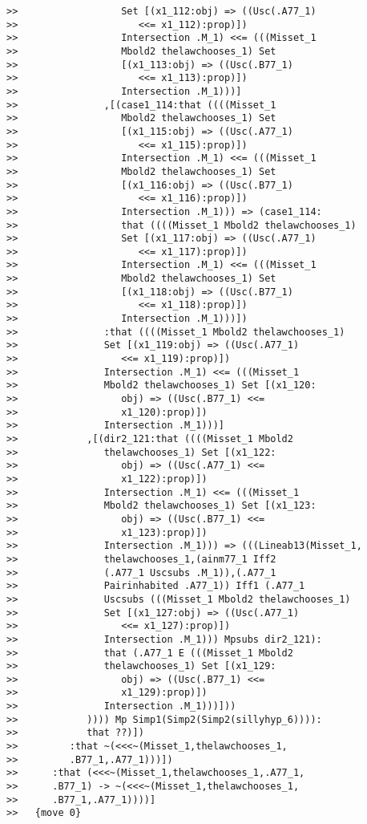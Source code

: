 \documentclass[12pt]{article}
\begin{document}
\begin{verbatim}
>>                  Set [(x1_112:obj) => ((Usc(.A77_1)
>>                     <<= x1_112):prop)])
>>                  Intersection .M_1) <<= (((Misset_1
>>                  Mbold2 thelawchooses_1) Set
>>                  [(x1_113:obj) => ((Usc(.B77_1)
>>                     <<= x1_113):prop)])
>>                  Intersection .M_1)))]
>>               ,[(case1_114:that ((((Misset_1
>>                  Mbold2 thelawchooses_1) Set
>>                  [(x1_115:obj) => ((Usc(.A77_1)
>>                     <<= x1_115):prop)])
>>                  Intersection .M_1) <<= (((Misset_1
>>                  Mbold2 thelawchooses_1) Set
>>                  [(x1_116:obj) => ((Usc(.B77_1)
>>                     <<= x1_116):prop)])
>>                  Intersection .M_1))) => (case1_114:
>>                  that ((((Misset_1 Mbold2 thelawchooses_1)
>>                  Set [(x1_117:obj) => ((Usc(.A77_1)
>>                     <<= x1_117):prop)])
>>                  Intersection .M_1) <<= (((Misset_1
>>                  Mbold2 thelawchooses_1) Set
>>                  [(x1_118:obj) => ((Usc(.B77_1)
>>                     <<= x1_118):prop)])
>>                  Intersection .M_1)))])
>>               :that ((((Misset_1 Mbold2 thelawchooses_1)
>>               Set [(x1_119:obj) => ((Usc(.A77_1)
>>                  <<= x1_119):prop)])
>>               Intersection .M_1) <<= (((Misset_1
>>               Mbold2 thelawchooses_1) Set [(x1_120:
>>                  obj) => ((Usc(.B77_1) <<=
>>                  x1_120):prop)])
>>               Intersection .M_1)))]
>>            ,[(dir2_121:that ((((Misset_1 Mbold2
>>               thelawchooses_1) Set [(x1_122:
>>                  obj) => ((Usc(.A77_1) <<=
>>                  x1_122):prop)])
>>               Intersection .M_1) <<= (((Misset_1
>>               Mbold2 thelawchooses_1) Set [(x1_123:
>>                  obj) => ((Usc(.B77_1) <<=
>>                  x1_123):prop)])
>>               Intersection .M_1))) => (((Lineab13(Misset_1,
>>               thelawchooses_1,(ainm77_1 Iff2
>>               (.A77_1 Uscsubs .M_1)),(.A77_1
>>               Pairinhabited .A77_1)) Iff1 (.A77_1
>>               Uscsubs (((Misset_1 Mbold2 thelawchooses_1)
>>               Set [(x1_127:obj) => ((Usc(.A77_1)
>>                  <<= x1_127):prop)])
>>               Intersection .M_1))) Mpsubs dir2_121):
>>               that (.A77_1 E (((Misset_1 Mbold2
>>               thelawchooses_1) Set [(x1_129:
>>                  obj) => ((Usc(.B77_1) <<=
>>                  x1_129):prop)])
>>               Intersection .M_1)))]))
>>            )))) Mp Simp1(Simp2(Simp2(sillyhyp_6)))):
>>            that ??)])
>>         :that ~(<<<~(Misset_1,thelawchooses_1,
>>         .B77_1,.A77_1)))])
>>      :that (<<<~(Misset_1,thelawchooses_1,.A77_1,
>>      .B77_1) -> ~(<<<~(Misset_1,thelawchooses_1,
>>      .B77_1,.A77_1))))]
>>   {move 0}



\end{verbatim}
\end{document}
